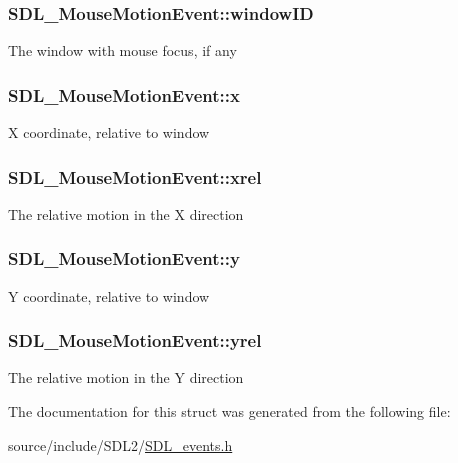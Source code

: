 \subsubsection[{window\+I\+D}]{ S\+D\+L\+\_\+\+Mouse\+Motion\+Event\+::window\+I\+D}\label{struct_s_d_l___mouse_motion_event_aa9976725242ada93a9e18e7fdf5796e6}
The window with mouse focus, if any \hypertarget{struct_s_d_l___mouse_motion_event_a36398bb4a5308446a262b0bfc8baa80a}{}
\subsubsection[{x}]{ S\+D\+L\+\_\+\+Mouse\+Motion\+Event\+::x}\label{struct_s_d_l___mouse_motion_event_a36398bb4a5308446a262b0bfc8baa80a}
X coordinate, relative to window \hypertarget{struct_s_d_l___mouse_motion_event_a1c01d9aba2a20778fb45a15dca39ef58}{}
\subsubsection[{xrel}]{ S\+D\+L\+\_\+\+Mouse\+Motion\+Event\+::xrel}\label{struct_s_d_l___mouse_motion_event_a1c01d9aba2a20778fb45a15dca39ef58}
The relative motion in the X direction \hypertarget{struct_s_d_l___mouse_motion_event_a7e6a7b1f8713d1968dc913908e8ea448}{}
\subsubsection[{y}]{ S\+D\+L\+\_\+\+Mouse\+Motion\+Event\+::y}\label{struct_s_d_l___mouse_motion_event_a7e6a7b1f8713d1968dc913908e8ea448}
Y coordinate, relative to window \hypertarget{struct_s_d_l___mouse_motion_event_a7674c8b92d039ab948f671a180fa7b30}{}
\subsubsection[{yrel}]{ S\+D\+L\+\_\+\+Mouse\+Motion\+Event\+::yrel}\label{struct_s_d_l___mouse_motion_event_a7674c8b92d039ab948f671a180fa7b30}
The relative motion in the Y direction 

The documentation for this struct was generated from the following file\+:\begin{DoxyCompactItemize}
\item 
source/include/\+S\+D\+L2/\hyperlink{_s_d_l__events_8h}{S\+D\+L\+\_\+events.\+h}\end{DoxyCompactItemize}
